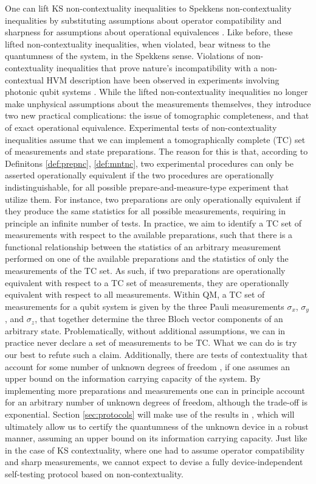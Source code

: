 One can lift KS non-contextuality inequalities to Spekkens non-contextuality inequalities by substituting assumptions about operator compatibility and sharpness for assumptions about operational equivalences \cite{Kunjwal2019}. Like before, these lifted non-contextuality inequalities, when violated, bear witness to the quantumness of the system, in the Spekkens sense. Violations of non-contextuality inequalities that prove nature's incompatibility with a non-contextual HVM description have been observed in experiments involving photonic qubit systems \cite{Mazurek2016}. While the lifted non-contextuality inequalities no longer make unphysical assumptions about the measurements themselves, they introduce two new practical complications: the issue of tomographic completeness, and that of exact operational equivalence. Experimental tests of non-contextuality inequalities assume that we can implement a tomographically complete (TC) set of measurements and state preparations. The reason for this is that, according to Definitons \ref{def:prepnc}, \ref{def:mntnc}, two experimental procedures can only be asserted operationally equivalent if the two procedures are operationally indistinguishable, for all possible prepare-and-measure-type experiment that utilize them. For instance, two preparations are only operationally equivalent if they produce the same statistics for all possible measurements, requiring in principle an infinite number of tests. In practice, we aim to identify a TC set of measurements with respect to the available preparations, such that there is a functional relationship between the statistics of an arbitrary measurement performed on one of the available preparations and the statistics of only the measurements of the TC set. As such, if two preparations are operationally equivalent with respect to a TC set of measurements, they are operationally equivalent with respect to all measurements. Within QM, a TC set of measurements for a qubit system is given by the three Pauli measurements $\sigma_x$, $\sigma_y$, and $\sigma_z$, that together determine the three Bloch vector components of an arbitrary state. Problematically, without additional assumptions, we can in practice never declare a set of measurements to be TC. What we can do is try our best to refute such a claim. Additionally, there are tests of contextuality that account for some number of unknown degrees of freedom \cite{Pusey2019a}, if one assumes an upper bound on the information carrying capacity of the system. By implementing more preparations and measurements one can in principle account for an arbitrary number of unknown degrees of freedom, although the trade-off is exponential. Section \ref{sec:protocols} will make use of the results in \cite{Pusey2019a}, which will ultimately allow us to certify the quantumness of the unknown device in a robust manner, assuming an upper bound on its information carrying capacity. Just like in the case of KS contextuality, where one had to assume operator compatibility and sharp measurements, we cannot expect to devise a fully device-independent self-testing protocol based on non-contextuality.

